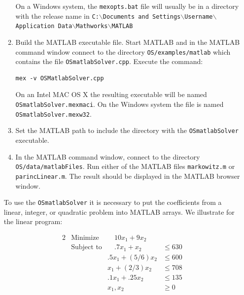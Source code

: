 \documentclass[11pt]{article}
\renewcommand{\_}{{\char"5F}}
\renewcommand{\{}{{\char"7B}}
\renewcommand{\}}{{\char"7D}}
\renewcommand{\^}{{\char"0D}}
\renewcommand{\'}{{\char"0D}}
\begin{document}
\begin{enumerate}[Step 1:]
\begin{enumerate}[{\bf Step 1:}]
On a Windows system, the {\tt  mexopts.bat} file will usually be in a directory with the release name in 
{\tt C:$\backslash$Documents and Settings$\backslash$Username$\backslash$Application Data$\backslash$Mathworks$\backslash$MATLAB}


\item{}  Build the MATLAB executable file. Start MATLAB and in the MATLAB command window connect to the directory {\tt OS/examples/matlab} which  contains the file {\tt OSmatlabSolver.cpp}.    Execute the command:

\begin{verbatim}
mex -v OSMatlabSolver.cpp
\end{verbatim}

On an Intel MAC OS X the resulting executable will be named {\tt OSmatlabSolver.mexmaci}. On the Windows system the file is named {\tt OSmatlabSolver.mexw32}.

\item{}  Set the MATLAB path to include the directory with the {\tt OSmatlabSolver} executable.


\item{}   In the MATLAB command window, connect to the directory {\tt OS/data/matlabFiles}. Run either of the MATLAB
files {\tt markowitz.m} or {\tt parincLinear.m}.  The result should be displayed in the MATLAB browser window.

\end{enumerate}


To use the {\tt OSmatlabSolver} it is necessary to put the coefficients  from a linear, integer, or quadratic problem into MATLAB arrays.   We illustrate for the linear program:

\begin{alignat}{2}
& \mbox{Minimize} & \quad
10 x_{1} + 9 x_{2}\label{eq:parinobj}\\
& \mbox{Subject to} & \quad .7x_{1} + x_{2}  &\le 630  \label{eq:parinccon1}\\
& & .5x_{1} + (5/6) x_{2} &\le 600 \label{eq:parinccon2}\\
& &  x_{1} + (2/3) x_{2} &\le 708 \label{eq:parinccon3}\\
& & .1x_{1} + .25 x_{2} &\le 135 \label{eq:parinccon4}\\
& & x_{1}, x_{2} &\ge 0 \label{eq:parincnonneg}
\end{alignat}


\end{enumerate}
\end{document}

